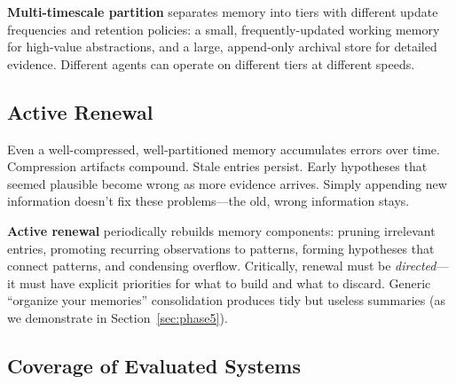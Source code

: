 \documentclass[11pt,letterpaper]{article}
\begin{document}
\textbf{Multi-timescale partition} separates memory into tiers with different update frequencies and retention policies: a small, frequently-updated working memory for high-value abstractions, and a large, append-only archival store for detailed evidence. Different agents can operate on different tiers at different speeds.

\subsection{Active Renewal}

Even a well-compressed, well-partitioned memory accumulates errors over time. Compression artifacts compound. Stale entries persist. Early hypotheses that seemed plausible become wrong as more evidence arrives. Simply appending new information doesn't fix these problems---the old, wrong information stays.

\textbf{Active renewal} periodically rebuilds memory components: pruning irrelevant entries, promoting recurring observations to patterns, forming hypotheses that connect patterns, and condensing overflow. Critically, renewal must be \emph{directed}---it must have explicit priorities for what to build and what to discard. Generic ``organize your memories'' consolidation produces tidy but useless summaries (as we demonstrate in Section~\ref{sec:phase5}).

\subsection{Coverage of Evaluated Systems}
\end{document}
